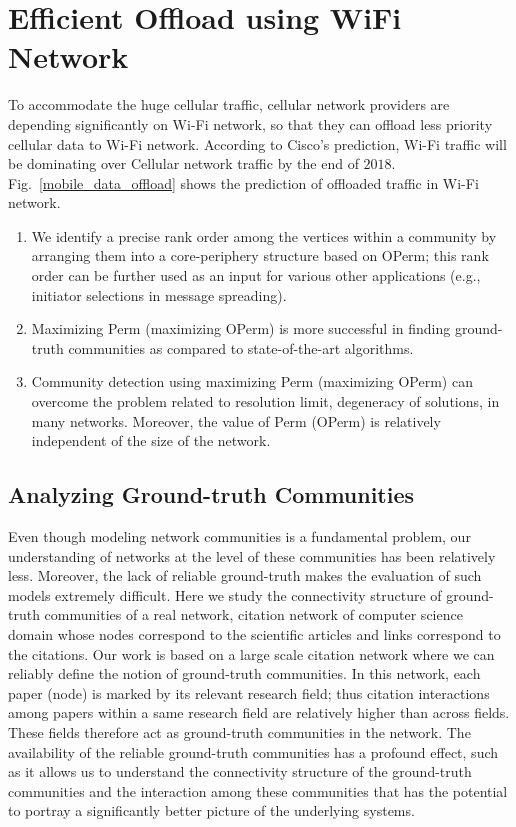 \section{Efficient Offload using WiFi Network} To accommodate the huge cellular traffic, cellular network providers are depending significantly on Wi-Fi network, so that they can offload less priority cellular data to Wi-Fi network. According to Cisco's prediction, Wi-Fi traffic will be dominating over Cellular network traffic by the end of $2018$. Fig.~\ref{mobile_data_offload} shows the prediction of offloaded traffic in Wi-Fi network.\\

\begin{enumerate}
\item We identify a precise rank order among the vertices within a community by arranging them into a core-periphery structure based on
OPerm; this rank order can be further used as an input for various other applications (e.g., initiator selections in message spreading).


\item Maximizing Perm (maximizing OPerm) is more successful in finding ground-truth communities as compared to state-of-the-art
algorithms.
\item Community detection using maximizing Perm (maximizing OPerm) can overcome the problem related to resolution limit, degeneracy of
solutions, in many
networks.
Moreover, the value of Perm (OPerm) is relatively independent of the size of the network. 

\end{enumerate}


\subsection{Analyzing Ground-truth Communities}
 Even though modeling network communities is a fundamental
problem, our understanding of networks at the level of these communities has been relatively less. Moreover, the lack of reliable
ground-truth makes the evaluation of such models extremely difficult. Here we study the connectivity structure of ground-truth communities
of a real network, citation network of computer science domain whose
nodes correspond to the scientific articles and links correspond to the citations. Our work is based on a large scale
citation
network where we can reliably define the notion of ground-truth communities. In this network, each paper (node) is marked by its relevant
research field; thus citation interactions among papers within a same research field are relatively higher than across fields. These fields
therefore act as ground-truth communities in the network. The availability of the reliable ground-truth communities has a profound effect,
such as it allows us to understand the connectivity structure of the ground-truth communities and the interaction among these communities
that has the potential to portray a significantly better picture of the underlying systems.


